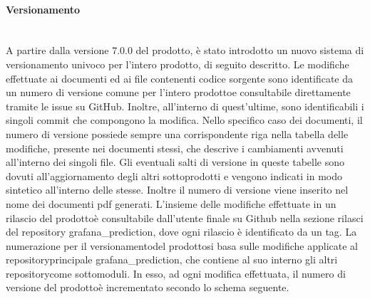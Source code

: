 		\paragraph{Versionamento}\mbox{}\\ [1mm]
		A partire dalla versione 7.0.0 del prodotto, è stato introdotto un nuovo sistema di versionamento univoco per l'intero prodotto\glo, di seguito descritto.
		\newline
		Le modifiche effettuate ai documenti ed ai file contenenti codice sorgente sono identificate da un numero di versione comune per l'intero prodotto\glosp e consultabile direttamente tramite le issue su GitHub. Inoltre, all'interno di quest'ultime, sono identificabili i singoli commit che compongono la modifica.
		\newline
		Nello specifico caso dei documenti, il numero di versione possiede sempre una corrispondente riga nella tabella delle modifiche, presente nei documenti stessi, che descrive i cambiamenti avvenuti all'interno dei singoli file. Gli eventuali salti di versione in queste tabelle sono dovuti all'aggiornamento degli altri sottoprodotti e vengono indicati in modo sintetico all'interno delle stesse. Inoltre il numero di versione viene inserito nel nome dei documenti pdf generati.
		\newline
		L'insieme delle modifiche effettuate in un rilascio del prodotto\glosp è consultabile dall'utente finale su Github nella sezione rilasci del repository grafana\_prediction, dove ogni rilascio è identificato da un tag.
		\newline
		La numerazione per il versionamento\glosp del prodotto\glosp si basa sulle modifiche applicate al repository\glosp principale grafana\_prediction, che contiene al suo interno gli altri repository\glosp come sottomoduli. In esso, ad ogni modifica effettuata, il numero di versione del prodotto\glosp è incrementato secondo lo schema seguente.
		
